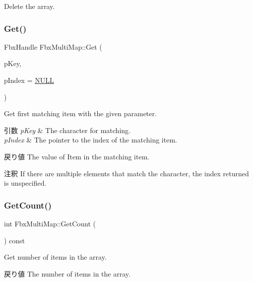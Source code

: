 Delete the array. 

\mbox{\label{class_fbx_multi_map_af0a42e2b8786d36bf7942318b9b89201}} 
\subsubsection{\texorpdfstring{Get()}{Get()}}
{\footnotesize\ttfamily Fbx\+Handle Fbx\+Multi\+Map\+::\+Get (\begin{DoxyParamCaption}\item[{Fbx\+Handle}]{p\+Key,  }\item[{int $\ast$}]{p\+Index = {\ttfamily \hyperlink{fbxarch_8h_a070d2ce7b6bb7e5c05602aa8c308d0c4}{N\+U\+LL}} }\end{DoxyParamCaption})}

Get first matching item with the given parameter. 
\begin{DoxyParams}{引数}
{\em p\+Key} & The character for matching. \\
\hline
{\em p\+Index} & The pointer to the index of the matching item. \\
\hline
\end{DoxyParams}
\begin{DoxyReturn}{戻り値}
The value of Item in the matching item. 
\end{DoxyReturn}
\begin{DoxyRemark}{注釈}
If there are multiple elements that match the character, the index returned is unspecified. 
\end{DoxyRemark}
\mbox{\label{class_fbx_multi_map_a5e496eeb0e6154087fd2259539c16782}} 
\subsubsection{\texorpdfstring{Get\+Count()}{GetCount()}}
{\footnotesize\ttfamily int Fbx\+Multi\+Map\+::\+Get\+Count (\begin{DoxyParamCaption}{ }\end{DoxyParamCaption}) const}

Get number of items in the array. \begin{DoxyReturn}{戻り値}
The number of items in the array. 
\end{DoxyReturn}
\mbox{\label{class_fbx_multi_map_a335ac1a6e65c336cdcb06cb425bec932}} 
